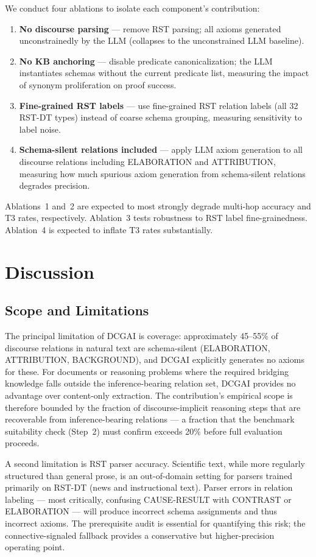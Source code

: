\documentclass[11pt,letterpaper]{article}
\begin{document}
We conduct four ablations to isolate each component's contribution:
\begin{enumerate}
  \item \textbf{No discourse parsing} --- remove RST parsing; all axioms generated unconstrainedly by the LLM
    (collapses to the unconstrained LLM baseline).
  \item \textbf{No KB anchoring} --- disable predicate canonicalization; the LLM instantiates schemas without the
    current predicate list, measuring the impact of synonym proliferation on proof success.
  \item \textbf{Fine-grained RST labels} --- use fine-grained RST relation labels (all 32 RST-DT types) instead of
    coarse schema grouping, measuring sensitivity to label noise.
  \item \textbf{Schema-silent relations included} --- apply LLM axiom generation to all discourse relations
    including ELABORATION and ATTRIBUTION, measuring how much spurious axiom generation from schema-silent
    relations degrades precision.
\end{enumerate}
Ablations~1 and~2 are expected to most strongly degrade multi-hop accuracy and T3 rates, respectively. Ablation~3
tests robustness to RST label fine-grainedness. Ablation~4 is expected to inflate T3 rates substantially.

\section{Discussion}

\subsection{Scope and Limitations}

The principal limitation of DCGAI is coverage: approximately 45--55\% of discourse relations in natural text are
schema-silent (ELABORATION, ATTRIBUTION, BACKGROUND), and DCGAI explicitly generates no axioms for these. For
documents or reasoning problems where the required bridging knowledge falls outside the inference-bearing relation
set, DCGAI provides no advantage over content-only extraction. The contribution's empirical scope is therefore
bounded by the fraction of discourse-implicit reasoning steps that are recoverable from inference-bearing relations
--- a fraction that the benchmark suitability check (Step~2) must confirm exceeds 20\% before full evaluation
proceeds.

A second limitation is RST parser accuracy. Scientific text, while more regularly structured than general prose,
is an out-of-domain setting for parsers trained primarily on RST-DT (news and instructional text). Parser errors
in relation labeling --- most critically, confusing CAUSE-RESULT with CONTRAST or ELABORATION --- will produce
incorrect schema assignments and thus incorrect axioms. The prerequisite audit is essential for quantifying this
risk; the connective-signaled fallback provides a conservative but higher-precision operating point.
\end{document}
